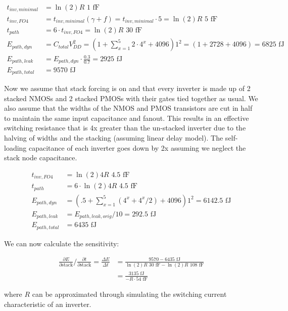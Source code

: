 \documentclass[11pt]{article}
\begin{document}
\begin{align}
	t_{inv,minimal} &= \ln(2) R \text{ 1 fF} \nonumber \\
	t_{inv,FO4} &= t_{inv,minimal} (\gamma + f) = t_{inv,minimal} \cdot 5 = \ln(2) R \text{ 5 fF} \nonumber \\
	t_{path} &= 6 \cdot t_{inv,FO4} = \ln(2) R \text{ 30 fF} \nonumber \\
	E_{path,dyn} &= C_{total} V_{DD}^2 = (1 + \sum_{x=1}^{5}2 \cdot 4^x + 4096) 1^2 = (1 + 2728 + 4096) = 6825 \text{ fJ} \nonumber \\
	E_{path,leak} &= E_{path,dyn} \cdot \frac{0.3}{0.7} = 2925 \text{ fJ}\nonumber \\
	E_{path,total} &= 9570 \text{ fJ} \nonumber
\end{align}

Now we assume that stack forcing is on and that every inverter is made up of 2 stacked NMOSs and 2 stacked PMOSs with their gates tied together as usual. We also assume that the widths of the NMOS and PMOS transistors are cut in half to maintain the same input capacitance and fanout. This results in an effective switching resistance that is 4x greater than the un-stacked inverter due to the halving of widths and the stacking (assuming linear delay model). The self-loading capacitance of each inverter goes down by 2x assuming we neglect the stack node capacitance.

\begin{align}
	t_{inv,FO4} &= \ln(2) 4R \text{ 4.5 fF} \nonumber \\
	t_{path} &= 6 \cdot \ln(2) 4R \text{ 4.5 fF} \nonumber \\
	E_{path,dyn} &= (.5 + \sum_{x=1}^{5}(4^x + 4^x/2) + 4096) 1^2 = 6142.5 \text{ fJ} \nonumber \\
	E_{path,leak} &= E_{path,leak,orig} / 10 = 292.5 \text{ fJ} \nonumber \\
	E_{path,total} &= 6435 \text{ fJ} \nonumber
\end{align}

We can now calculate the sensitivity:

\begin{align}
	\frac{\partial E}{\partial \text{stack}} \bigg/ \frac{\partial t}{\partial \text{stack}} = \frac{\Delta E}{\Delta t} &= \frac{9570 - 6435 \text{ fJ}}{\ln(2) R \text{ 30 fF} - \ln(2) R \text{ 108 fF}} \nonumber \\
	&= \frac{3135 \text{ fJ}}{-R \cdot 54 \text{ fF}} \nonumber
\end{align}

where $R$ can be approximated through simulating the switching current characteristic of an inverter.

\newpage
\appendix
\end{document}
